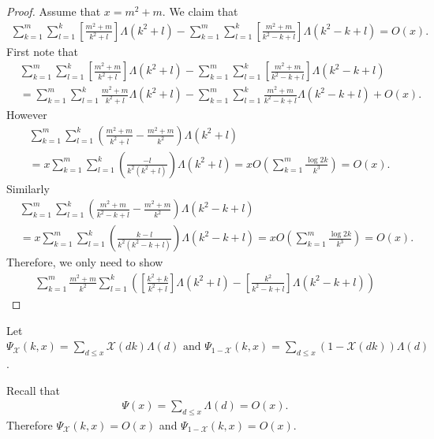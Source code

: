 \documentclass[a4paper,10pt]{amsart}
\newcommand{\X}{\mathcal X}
\begin{document}
\begin{proof}
    Assume that $x = m^2+m$. We claim that 
    \begin{align*}
        \sum_{k=1}^{m} \sum_{l=1}^{k}\left[\frac{m^2+m}{k^2+l} 
        \right]\Lambda(k^2+l) 
        - \sum_{k=1}^{m} \sum_{l=1}^{k}\left[\frac{m^2+m}{k^2-k+l} \right]
        \Lambda(k^2-k+l) = O(x).
    \end{align*} 
    First note that
    \begin{align*}
        &\sum_{k=1}^{m} \sum_{l=1}^{k}\left[\frac{m^2+m}{k^2+l} 
        \right]\Lambda(k^2+l) 
        - \sum_{k=1}^{m} \sum_{l=1}^{k}\left[\frac{m^2+m}{k^2-k+l} \right]
        \Lambda(k^2-k+l) \\
        &=
        \sum_{k=1}^{m} \sum_{l=1}^{k}\frac{m^2+m}{k^2+l} 
        \Lambda(k^2+l) 
        - \sum_{k=1}^{m} \sum_{l=1}^{k}\frac{m^2+m}{k^2-k+l}
        \Lambda(k^2-k+l) + O(x).
    \end{align*}
    However
    \begin{align*}
        &\sum_{k=1}^{m} \sum_{l=1}^{k}(\frac{m^2+m}{k^2+l} - \frac{m^2+m}{k^2}) 
        \Lambda(k^2+l)\\
        &=x\sum_{k=1}^{m} \sum_{l=1}^{k}(\frac{-l}{k^2(k^2+l)})
        \Lambda(k^2+l)
        = xO(\sum_{k=1}^{m}\frac{\log 2k}{k^3}) = O(x). 
    \end{align*}
    Similarly
    \begin{align*}
        &\sum_{k=1}^{m} \sum_{l=1}^{k}(\frac{m^2+m}{k^2 -k +l} - \frac{m^2+m}{k^2}) 
        \Lambda(k^2-k+l)\\
        &=x\sum_{k=1}^{m} \sum_{l=1}^{k}(\frac{k-l}{k^2(k^2-k+l)})
        \Lambda(k^2-k+l)
        = xO(\sum_{k=1}^{m}\frac{\log 2k}{k^3}) = O(x). 
    \end{align*}
    Therefore, we only need to show
    \begin{align*}
        \sum_{k=1}^{m} \frac{m^2+m}{k^2}\sum_{l=1}^{k}\left (
        \left[\frac{k^2+k}{k^2+l}\right]\Lambda(k^2+l) -
    \left[\frac{k^2}{k^2-k+l}\right]\Lambda(k^2-k+l) \right)
    \end{align*}
\end{proof}

Let $\Psi_{\X}(k,x) = \sum_{d \leq x}\X(dk)\Lambda(d) \mbox{ and }
\Psi_{1-\X}(k,x) = \sum_{d \leq x}(1-\X(dk))\Lambda(d)$.

Recall that
\begin{align*}
    \Psi(x) = \sum_{d \leq x}\Lambda(d) = O(x).
\end{align*}
Therefore $\Psi_{\X}(k,x) = O(x)$ and $\Psi_{1-\X}(k,x) = O(x)$.
\end{document}

